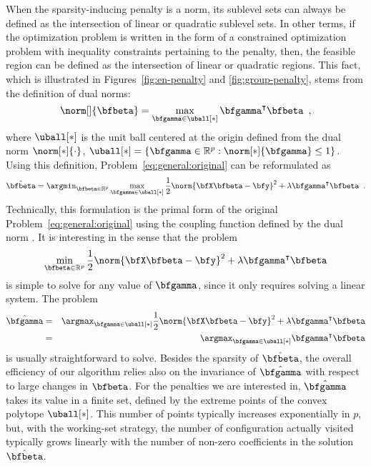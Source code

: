 When the sparsity-inducing penalty is a norm, its sublevel sets can always be
defined as the intersection of linear or quadratic sublevel sets.  In other
terms, if the optimization problem is written in the form of a constrained
optimization problem with inequality constraints pertaining to the penalty,
then, the feasible region can be defined as the intersection of linear or
quadratic regions. 
This fact, which is illustrated in Figures~\ref{fig:en-penalty} and
\ref{fig:group-penalty}, stems from the definition of dual norms:
%
\begin{equation*}%
  \norm[]{\bfbeta} = \max_{\bfgamma\in\uball[*]} \bfgamma^\intercal \bfbeta
  \enspace,
\end{equation*}
where $\uball[*]$ is the unit ball centered at the origin defined from the dual
norm $\norm[*]{\cdot}$,
$\uball[*]=\left\{\bfgamma\in\mathbb{R}^p:\norm[*]{\bfgamma}\leq 1\right\}$.
Using this definition, Problem~\eqref{eq:general:original} can be reformulated
as
%
\begin{equation}\label{eq:general:primal}
  \hat{\bfbeta} = \argmin_{\bfbeta\in\mathbb{R}^p} 
  \max_{\bfgamma\in\uball[*]}
    \frac{1}{2} \norm{\bfX \bfbeta - \bfy}^2 + 
    \lambda \bfgamma^\intercal \bfbeta
  \enspace. 
\end{equation}
%
Technically, this formulation is the primal form of the original 
Problem~\eqref{eq:general:original} using the coupling function defined by the 
dual norm \citep[see e.g.][]{Gilbert16, Bonnans06}. 
It is interesting in the sense that the problem
%
\begin{equation*}
  \min_{\bfbeta\in\mathbb{R}^p} 
  \frac{1}{2} \norm{\bfX \bfbeta - \bfy}^2 + 
  \lambda \bfgamma^\intercal \bfbeta
\end{equation*}
%
is simple to solve for any value of $\bfgamma$, since it only requires solving 
a linear system.
The problem
%
\begin{eqnarray}
  \hat{\bfgamma} & = & \argmax_{\bfgamma\in\uball[*]}
    \frac{1}{2} \norm{\bfX \bfbeta - \bfy}^2 + 
    \lambda \bfgamma^\intercal \bfbeta \nonumber \\
     & = & \argmax_{\bfgamma\in\uball[*]}
    \bfgamma^\intercal \bfbeta \label{eq:optimal_gamma}
\end{eqnarray}
%
is usually straightforward to solve.
Besides the sparsity of $\hat{\bfbeta}$, the overall efficiency of our algorithm
relies also on the invariance of $\hat{\bfgamma}$ with respect to
large changes in $\bfbeta$. 
For the penalties we are interested in, $\hat{\bfgamma}$ takes its value in a
finite set, defined by the extreme points of the convex polytope $\uball[*]$.
This number of points typically increases exponentially in $p$, but, with the working-set
strategy, the number of configuration actually visited typically grows linearly
with the number of non-zero coefficients in the solution $\hat{\bfbeta}$.

